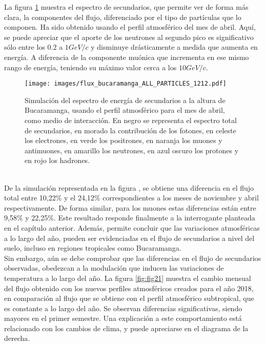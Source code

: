 La figura \ref{fig:fig20} muestra el espectro de secundarios, que permite ver de forma más clara, la componentes del flujo, diferenciado por el tipo de partículas que lo componen. Ha sido obtenido usando el perfil atmosférico del mes de abril. Aquí, se puede apreciar que el aporte de los neutrones al segundo pico es significativo sólo entre los $0.2$ a $1 GeV/c$ y disminuye drásticamente a medida que aumenta en energía. A diferencia de la componente muónica que incrementa en ese mismo rango de energía, teniendo su máximo valor cerca a los $10 GeV/c$.\\
\begin{figure}[htb!]
\centering
\texttt{[image: images/flux\_bucaramanga\_ALL\_PARTICLES\_1212.pdf]}
\caption[Espectro de energía de secundarios a la altura de Bucaramanga]{Simulación del espectro de energía de secundarios a la altura de Bucaramanga, usando el perfil atmosférico para el mes de abril, como medio de interacción. En negro se representa el espectro total de secundarios, en morado la contribución de los fotones, en celeste los electrones, en verde los positrones, en naranja los muones y antimuones, en amarillo los neutrones, en azul oscuro los protones y en rojo los hadrones.}
\label{fig:fig20}
\end{figure}\\
De la simulación representada en la figura \label{fig:fig19}, se obtiene una diferencia en el flujo total entre 10,22$\%$ y el 24,12$\%$ correspondientes a los meses de noviembre y abril respectivamente. De forma similar, para los muones estas diferencias están entre 9,58$\%$ y 22,25$\%$. Este resultado responde finalmente a la interrogante planteada en el capítulo anterior. Además, permite concluir que las variaciones atmosféricas a lo largo del año, pueden ser evidenciadas en el flujo de secundarios a nivel del suelo, incluso en regiones tropicales como Bucaramanga.\\

Sin embargo, aún se debe comprobar que las diferencias en el flujo de secundarios observadas, obedezcan a la modulación que inducen las variaciones de temperatura a lo largo del año. La figura \ref{fig:fig21} muestra el cambio mensual del flujo obtenido con los nuevos perfiles atmosféricos creados para el año 2018, en comparación al flujo que se obtiene con el perfil atmosférico subtropical, que es constante a lo largo del año. Se observan diferencias significativas, siendo mayores en el primer semestre. Una explicación a este comportamiento está relacionado con los cambios de clima, y puede apreciarse en el diagrama de la derecha.\\

